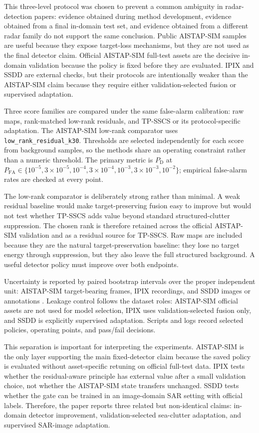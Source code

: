 \documentclass[journal]{IEEEtran}
\begin{document}
This three-level protocol was chosen to prevent a common ambiguity in radar-detection papers: evidence obtained during method development, evidence obtained from a final in-domain test set, and evidence obtained from a different radar family do not support the same conclusion. Public AISTAP-SIM samples are useful because they expose target-loss mechanisms, but they are not used as the final detector claim. Official AISTAP-SIM full-test assets are the decisive in-domain validation because the policy is fixed before they are evaluated. IPIX and SSDD are external checks, but their protocols are intentionally weaker than the AISTAP-SIM claim because they require either validation-selected fusion or supervised adaptation.

Three score families are compared under the same false-alarm calibration: raw maps, rank-matched low-rank residuals, and TP-SSCS or its protocol-specific adaptation. The AISTAP-SIM low-rank comparator uses \texttt{low\_rank\_residual\_k30}. Thresholds are selected independently for each score from background samples, so the methods share an operating constraint rather than a numeric threshold. The primary metric is $P_{\mathrm{D}}$ at $P_{\mathrm{FA}}\in\{10^{-5},3\times10^{-5},10^{-4},3\times10^{-4},10^{-3},3\times10^{-3},10^{-2}\}$; empirical false-alarm rates are checked at every point.

The low-rank comparator is deliberately strong rather than minimal. A weak residual baseline would make target-preserving fusion easy to improve but would not test whether TP-SSCS adds value beyond standard structured-clutter suppression. The chosen rank is therefore retained across the official AISTAP-SIM validation and as a residual source for TP-SSCS. Raw maps are included because they are the natural target-preservation baseline: they lose no target energy through suppression, but they also leave the full structured background. A useful detector policy must improve over both endpoints.

Uncertainty is reported by paired bootstrap intervals over the proper independent unit: AISTAP-SIM target-bearing frames, IPIX recordings, and SSDD images or annotations \cite{efron1979bootstrap}. Leakage control follows the dataset roles: AISTAP-SIM official assets are not used for model selection, IPIX uses validation-selected fusion only, and SSDD is explicitly supervised adaptation. Scripts and logs record selected policies, operating points, and pass/fail decisions.

This separation is important for interpreting the experiments. AISTAP-SIM is the only layer supporting the main fixed-detector claim because the saved policy is evaluated without asset-specific retuning on official full-test data. IPIX tests whether the residual-aware principle has external value after a small validation choice, not whether the AISTAP-SIM state transfers unchanged. SSDD tests whether the gate can be trained in an image-domain SAR setting with official labels. Therefore, the paper reports three related but non-identical claims: in-domain detector improvement, validation-selected sea-clutter adaptation, and supervised SAR-image adaptation.
\end{document}
